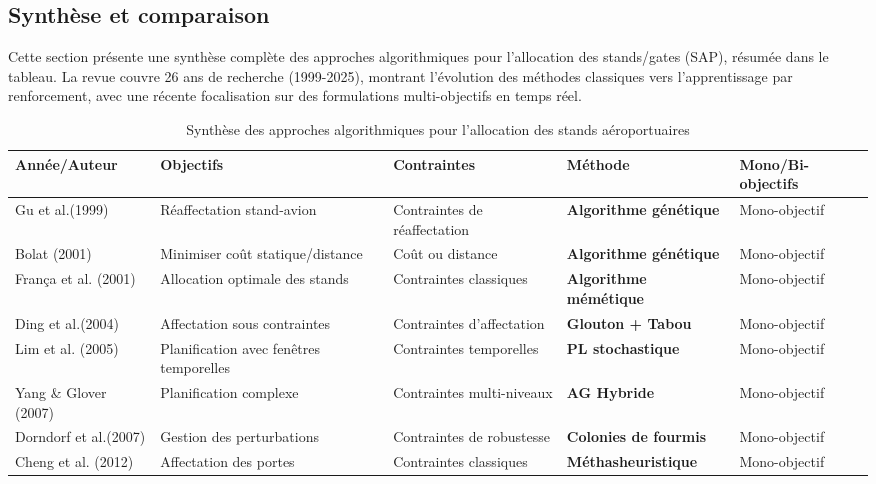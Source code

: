 \subsection{Synthèse et comparaison}
\vspace{-0.5em}
Cette section présente une synthèse complète des approches algorithmiques pour l’allocation des stands/gates (\ac{SAP}), résumée dans le tableau. La revue couvre 26 ans de recherche (1999-2025), montrant l’évolution des méthodes classiques vers l’apprentissage par renforcement, avec une récente focalisation sur des formulations multi-objectifs en temps réel.


\renewcommand{\arraystretch}{1.3}
\begin{table}[!htbp]
	\scriptsize
	\centering
	\label{tab:algorithmes}
	\caption{Synthèse des approches algorithmiques pour l’allocation des stands aéroportuaires}
	\begin{tabularx}{1.1\textwidth}{@{}p{3.3cm}p{3.2cm}p{3.7cm}p{3cm}p{2.3cm}@{}}
		\toprule
		Année/Auteur & Objectifs & Contraintes & Méthode & Mono/Bi-objectifs \\
		\midrule
		Gu et al.(1999) \cite{Gu_1999} & Réaffectation stand-avion & Contraintes de réaffectation & \textbf{Algorithme génétique} & Mono-objectif \\
		Bolat (2001) \cite{Bolat_2001} & Minimiser coût statique/distance & Coût ou distance & \textbf{Algorithme génétique} & Mono-objectif \\
		França et al. (2001) \cite{Franca_2001} & Allocation optimale des stands & Contraintes classiques & \textbf{Algorithme mémétique} & Mono-objectif \\
		Ding et al.(2004) \cite{Ding_2004} & Affectation sous contraintes & Contraintes d’affectation & \textbf{Glouton + Tabou} & Mono-objectif \\
		Lim et al. (2005) \cite{Lim_2005} & Planification avec fenêtres temporelles & Contraintes temporelles & \textbf{PL stochastique} & Mono-objectif \\
		Yang \& Glover (2007) \cite{Yang_2007} & Planification complexe & Contraintes multi-niveaux & \textbf{AG Hybride} & Mono-objectif \\
		Dorndorf et al.(2007) \cite{Dorndorf_2007} & Gestion des perturbations & Contraintes de robustesse & \textbf{Colonies de fourmis} & Mono-objectif \\
		Cheng et al. (2012) \cite{Cheng_2012} & Affectation des portes & Contraintes classiques & \textbf{Méthasheuristique} & Mono-objectif \\

\end{tabularx}
\end{table}
